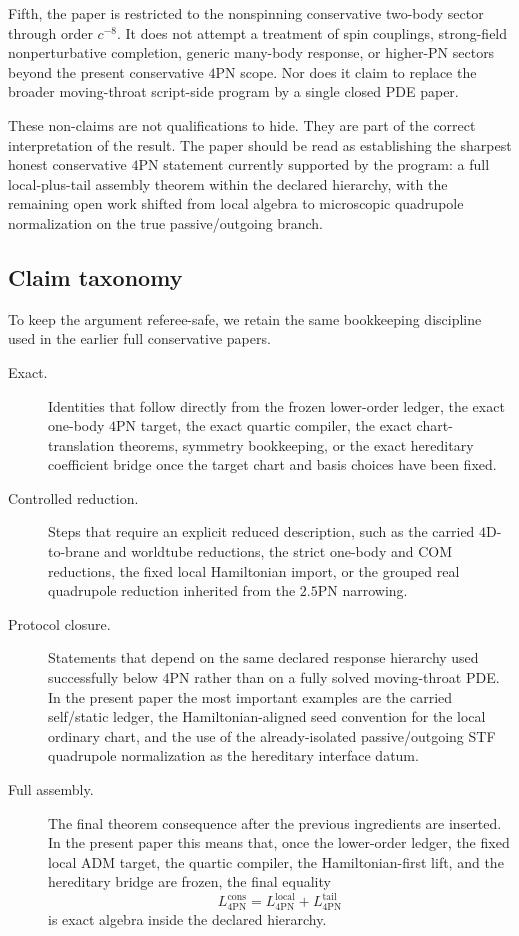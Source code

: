 \documentclass[11pt]{article}
\begin{document}
Fifth, the paper is restricted to the nonspinning conservative two-body sector
through order $c^{-8}$.  It does not attempt a treatment of spin couplings,
strong-field nonperturbative completion, generic many-body response, or higher-PN
sectors beyond the present conservative $4$PN scope.  Nor does it claim to
replace the broader moving-throat script-side program by a single closed PDE
paper.

These non-claims are not qualifications to hide.  They are part of the correct
interpretation of the result.  The paper should be read as establishing the
sharpest honest conservative $4$PN statement currently supported by the program:
a full local-plus-tail assembly theorem within the declared hierarchy, with the
remaining open work shifted from local algebra to microscopic quadrupole
normalization on the true passive/outgoing branch.

\subsection{Claim taxonomy}
\label{sec:intro-taxonomy}

To keep the argument referee-safe, we retain the same bookkeeping discipline
used in the earlier full conservative papers.
\begin{description}
  \item[Exact.] Identities that follow directly from the frozen lower-order
  ledger, the exact one-body $4$PN target, the exact quartic compiler, the exact
  chart-translation theorems, symmetry bookkeeping, or the exact hereditary
  coefficient bridge once the target chart and basis choices have been fixed.

  \item[Controlled reduction.] Steps that require an explicit reduced
  description, such as the carried $4$D-to-brane and worldtube reductions, the
  strict one-body and COM reductions, the fixed local Hamiltonian import, or the
  grouped real quadrupole reduction inherited from the $2.5$PN narrowing.

  \item[Protocol closure.] Statements that depend on the same declared response
  hierarchy used successfully below $4$PN rather than on a fully solved
  moving-throat PDE.  In the present paper the most important examples are the
  carried self/static ledger, the Hamiltonian-aligned seed convention for the
  local ordinary chart, and the use of the already-isolated passive/outgoing STF
  quadrupole normalization as the hereditary interface datum.

  \item[Full assembly.] The final theorem consequence after the previous
  ingredients are inserted.  In the present paper this means that, once the
  lower-order ledger, the fixed local ADM target, the quartic compiler, the
  Hamiltonian-first lift, and the hereditary bridge are frozen, the final
  equality
  \[
  L_{4\mathrm{PN}}^{\mathrm{cons}}
  =
  L_{4\mathrm{PN}}^{\mathrm{local}}
  +
  L_{4\mathrm{PN}}^{\mathrm{tail}}
  \]
  is exact algebra inside the declared hierarchy.
\end{description}
\end{document}

